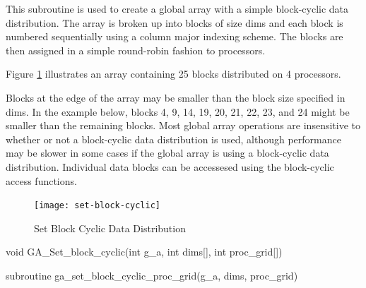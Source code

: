 \documentclass[12pt]{article}
\begin{document}
\begin{desc}

This subroutine is used to create a global array with a simple block-cyclic
data distribution. The array is broken up into blocks of size dims and each
block is numbered sequentially using a column major indexing scheme. The blocks
are then assigned in a simple round-robin fashion to processors.

Figure \ref{stblkcy} illustrates an array containing 25 blocks distributed on 4
processors.

Blocks at the edge of the array may be smaller than the block size specified in
dims. In the example below, blocks 4, 9, 14, 19, 20, 21, 22, 23, and 24 might
be smaller than the remaining blocks. Most global array operations are
insensitive to whether or not a block-cyclic data distribution is used,
although performance may be slower in some cases if the global array is using a
block-cyclic data distribution. Individual data blocks can be accessesed using
the block-cyclic access functions.

\begin{figure}
\centering
\texttt{[image: set-block-cyclic]}
\caption{Set Block Cyclic Data Distribution}
\label{stblkcy}
\end{figure}

\end{desc}


\begin{capi}
\begin{ccode}
void GA_Set_block_cyclic(int g_a, int dims[], int proc_grid[])
\end{ccode}
\begin{funcargs}
\end{funcargs}
\end{capi}

\begin{fapi}
\begin{fcode}
subroutine ga_set_block_cyclic_proc_grid(g_a, dims, proc_grid)
\end{fcode}
\begin{funcargs}
\end{funcargs}
\end{fapi}
\end{document}
